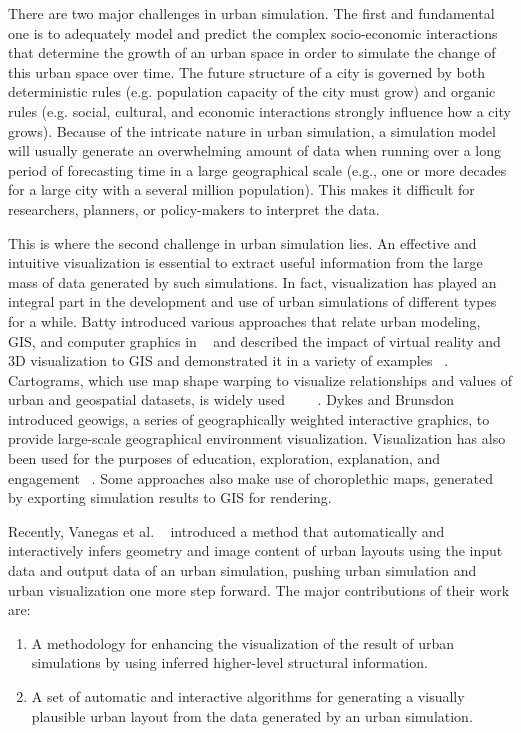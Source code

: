 \documentclass{egpubl}
\begin{document}
There are two major challenges in urban simulation. The first and fundamental one is to adequately model and predict the complex socio-economic interactions that determine the growth of an urban space in order to simulate the change of this urban space over time. The future structure of a city is governed by both deterministic rules (e.g. population capacity of the city must grow) and organic rules (e.g. social, cultural, and economic interactions strongly influence how a city grows). Because of the intricate nature in urban simulation, a simulation model will usually generate an overwhelming amount of data when running over a long period of forecasting time in a large geographical scale (e.g., one or more decades for a large city with a several million population). This makes it difficult for researchers, planners, or policy-makers to interpret the data.

This is where the second challenge in urban simulation lies. An effective and intuitive visualization is essential to extract useful information from the large mass of data generated by such simulations. In fact, visualization has played an integral part in the development and use of urban simulations of different types for a while. Batty introduced various approaches that relate urban modeling, GIS, and computer graphics in ~\cite{batty1993urban} and described the impact of virtual reality and 3D visualization to GIS and demonstrated it in a variety of examples ~\cite{batty1997virtual}. Cartograms, which use map shape warping to visualize relationships and values of urban and geospatial datasets, is widely used ~\cite{dorling2006worldmapper}~\cite{hertzmann2001image}~\cite{panse2006visualization}~\cite{pinnel2000design}. Dykes and Brunsdon ~\cite{dykes2007geographically} introduced geowigs, a series of geographically weighted interactive graphics, to provide large-scale geographical environment visualization. Visualization has also been used for the purposes of education, exploration, explanation, and engagement ~\cite{batty2006visualization}. Some approaches also make use of choroplethic maps, generated by exporting simulation results to GIS for rendering.

Recently, Vanegas et al. ~\cite{vanegas2009visualization} introduced a method that automatically and interactively infers geometry and image content of urban layouts using the input data and output data of an urban simulation, pushing urban simulation and urban visualization one more step forward. The major contributions of their work are:
\begin{enumerate}
  \item A methodology for enhancing the visualization of the result of urban simulations by using inferred higher-level structural information.
  \item A set of automatic and interactive algorithms for generating a visually plausible urban layout from the data generated by an urban simulation.
\end{enumerate}
\end{document}
